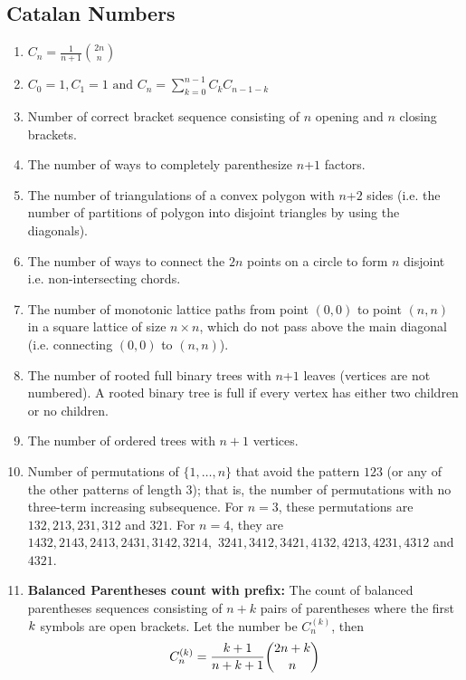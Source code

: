 \subsection{Catalan Numbers}
\begin{enumerate}[resume]
    \item $\displaystyle C_n=\frac{1}{n+1}{2n \choose n}$
    \item $\displaystyle C_0=1,C_1=1\text{ and }C_n=\sum \limits_{k=0}^{n-1}C_k C_{n-1-k}$
    \item Number of correct bracket sequence consisting of $n$ opening and $n$ closing brackets.
    \item The number of ways to completely parenthesize $n$+$\displaystyle 1$ factors.
    \item The number of triangulations of a convex polygon with $n$+$\displaystyle 2$ sides (i.e. the number of partitions of polygon into disjoint triangles by using the diagonals).
    \item The number of ways to connect the $\displaystyle 2n$ points on a circle to form $n$ disjoint i.e. non-intersecting chords.
    \item The number of monotonic lattice paths from point $\displaystyle (0,0)$ to point $\displaystyle (n,n)$ in a square lattice of size $n\times n$, which do not pass above the main diagonal (i.e. connecting $\displaystyle (0,0)$ to $\displaystyle (n,n)$).
    \item The number of rooted full binary trees with $n$+$\displaystyle 1$ leaves (vertices are not numbered). A rooted binary tree is full if every vertex has either two children or no children.
    \item The number of ordered trees with $n+1$ vertices.
    \item Number of permutations of $\{1, \dots, n\}$ that avoid the pattern $123$ (or any of the other patterns of length $3$); that is, the number of permutations with no three-term increasing subsequence. For $n = 3$, these permutations are $132, 213, 231, 312$ and $321$. For $n = 4$, they are
          $1432, 2143, 2413, 2431, 3142, 3214,$ \newline $3241, 3412, 3421, 4132, 4213, 4231, 4312$ and $4321.$
    \item \textbf{Balanced Parentheses count with prefix:}
          The count of balanced parentheses sequences consisting of $n+k$ pairs of parentheses where the first $\displaystyle \displaystyle k$ symbols are open brackets. Let the number be $\displaystyle C_n^{(k)}$, then
          \[\displaystyle \displaystyle C_n^{(k)} = \frac{k+1}{n+k+1} \binom{2n+k}{n}\]
\end{enumerate}

